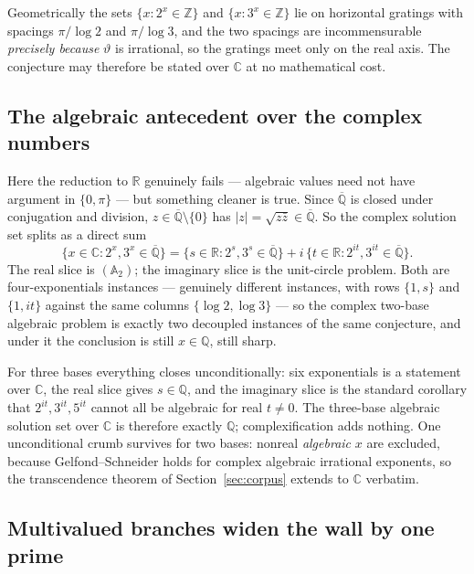 \documentclass[11pt,oneside]{article}
\theoremstyle{definition}
\theoremstyle{remark}
\newcommand{\Z}{\mathbb Z}
\newcommand{\Q}{\mathbb Q}
\newcommand{\R}{\mathbb R}
\newcommand{\C}{\mathbb C}
\newcommand{\Abar}{\overline{\mathbb Q}}
\newcommand{\thetaq}{\vartheta}
\newcommand{\Qbar}{\Abar}
\begin{document}
Geometrically the sets $\{x:2^x\in\Z\}$ and $\{x:3^x\in\Z\}$ lie on horizontal gratings with
spacings $\pi/\log2$ and $\pi/\log3$, and the two spacings are incommensurable \emph{precisely
because} $\thetaq$ is irrational, so the gratings meet only on the real axis.  The conjecture
may therefore be stated over $\C$ at no mathematical cost.

\subsection{The algebraic antecedent over the complex numbers}

Here the reduction to $\R$ genuinely fails --- algebraic values need not have argument in
$\{0,\pi\}$ --- but something cleaner is true.  Since $\Qbar$ is closed under conjugation and
division, $z\in\Qbar\setminus\{0\}$ has $|z|=\sqrt{z\bar z}\in\Qbar$.  So the complex solution
set splits as a direct sum
\[
  \{x\in\C:2^x,3^x\in\Qbar\}
  =\{s\in\R:2^s,3^s\in\Qbar\}+i\,\{t\in\R:2^{it},3^{it}\in\Qbar\} .
\]
The real slice is $(\mathbb A_2)$; the imaginary slice is the unit-circle problem.  Both are
four-exponentials instances --- genuinely different instances, with rows $\{1,s\}$ and
$\{1,it\}$ against the same columns $\{\log2,\log3\}$ --- so the complex two-base algebraic
problem is exactly two decoupled instances of the same conjecture, and under it the conclusion
is still $x\in\Q$, still sharp.

For three bases everything closes unconditionally: six exponentials is a statement over $\C$,
the real slice gives $s\in\Q$, and the imaginary slice is the standard corollary that
$2^{it},3^{it},5^{it}$ cannot all be algebraic for real $t\ne0$.  The three-base algebraic
solution set over $\C$ is therefore exactly $\Q$; complexification adds nothing.  One
unconditional crumb survives for two bases: nonreal \emph{algebraic} $x$ are excluded, because
Gelfond--Schneider holds for complex algebraic irrational exponents, so the transcendence
theorem of Section~\ref{sec:corpus} extends to $\C$ verbatim.

\subsection{Multivalued branches widen the wall by one prime}
\end{document}
